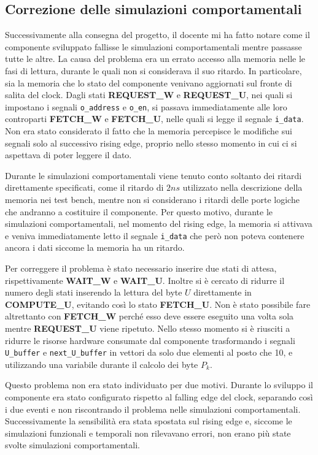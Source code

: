 \subsection{Correzione delle simulazioni comportamentali}

Successivamente alla consegna del progetto, il docente mi ha fatto notare come il componente sviluppato fallisse le simulazioni comportamentali mentre passasse tutte le altre. La causa del problema era un errato accesso alla memoria nelle le fasi di lettura, durante le quali non si considerava il suo ritardo. In particolare, sia la memoria che lo stato del componente venivano aggiornati sul fronte di salita del clock. Dagli stati \textbf{REQUEST\_W} e \textbf{REQUEST\_U}, nei quali si impostano i segnali \verb|o_address| e \verb|o_en|, si passava immediatamente alle loro controparti \textbf{FETCH\_W} e \textbf{FETCH\_U}, nelle quali si legge il segnale \verb|i_data|. Non era stato considerato il fatto che la memoria percepisce le modifiche sui segnali solo al successivo rising edge, proprio nello stesso momento in cui ci si aspettava di poter leggere il dato.

Durante le simulazioni comportamentali viene tenuto conto soltanto dei ritardi direttamente specificati, come il ritardo di $2ns$ utilizzato nella descrizione della memoria nei test bench, mentre non si considerano i ritardi delle porte logiche che andranno a costituire il componente. Per questo motivo, durante le simulazioni comportamentali, nel momento del rising edge, la memoria si attivava e veniva immediatamente letto il segnale \verb|i_data| che però non poteva contenere ancora i dati siccome la memoria ha un ritardo.

Per correggere il problema è stato necessario inserire due stati di attesa, rispettivamente \textbf{WAIT\_W} e \textbf{WAIT\_U}. Inoltre si è cercato di ridurre il numero degli stati inserendo la lettura del byte $U$ direttamente in \textbf{COMPUTE\_U}, evitando così lo stato \textbf{FETCH\_U}. Non è stato possibile fare altrettanto con \textbf{FETCH\_W} perché esso deve essere eseguito una volta sola mentre \textbf{REQUEST\_U} viene ripetuto. Nello stesso momento si è riusciti a ridurre le risorse hardware consumate dal componente trasformando i segnali \verb|U_buffer| e \verb|next_U_buffer| in vettori da solo due elementi al posto che 10, e utilizzando una variabile durante il calcolo dei byte $P_k$.

Questo problema non era stato individuato per due motivi. Durante lo sviluppo il componente era stato configurato rispetto al falling edge del clock, separando così i due eventi e non riscontrando il problema nelle simulazioni comportamentali. Successivamente la sensibilità era stata spostata sul rising edge e, siccome le simulazioni funzionali e temporali non rilevavano errori, non erano più state svolte simulazioni comportamentali.